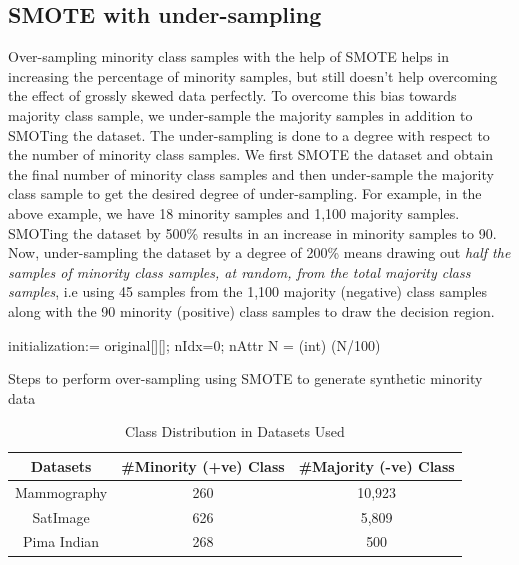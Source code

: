 \documentclass[10pt,journal,compsoc]{IEEEtran}
\begin{document}
\subsection{SMOTE with under-sampling}
\label{subsec:smoteu}
Over-sampling minority class samples with the help of SMOTE helps in increasing the percentage of minority samples, but still doesn't help overcoming the effect of grossly skewed data perfectly.
To overcome this bias towards majority class sample, we under-sample the majority samples in addition to SMOTing the dataset.
The under-sampling is done to a degree with respect to the number of minority class samples.
We first SMOTE the dataset and obtain the final number of minority class samples and then under-sample the majority class sample to get the desired degree of under-sampling.
For example, in the above example, we have 18 minority samples and 1,100 majority samples. 
SMOTing the dataset by 500\% results in an increase in minority samples to 90.
Now, under-sampling the dataset by a degree of 200\% means drawing out \textit{half the samples of minority class samples, at random, from the total majority class samples}, i.e using 45 samples from the 1,100 majority (negative) class samples along with the 90 minority (positive) class samples to draw the decision region.

\begin{algorithm}[!h]
 initialization:= original[][]; nIdx=0;  nAttr\;
   N = (int) (N/100)\;
 \caption{Steps to perform over-sampling using SMOTE to generate synthetic minority data}
 \label{algo:smote}
\end{algorithm}


\begin{table}[!t]
    \centering
    \begin{tabular}{|c||c|c|}
    	\hline
         Datasets & \#Minority (+ve) Class & \#Majority (-ve) Class  \\ \hline \hline  
        Mammography & 260 & 10,923 \\ \hline
        SatImage & 626 & 5,809 \\ \hline 
        Pima Indian & 268 & 500 \\ \hline
    \end{tabular}
    \caption{Class Distribution in Datasets Used}
    \label{tab:dataset}
\end{table}
\end{document}
